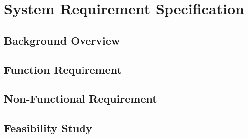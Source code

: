 \chapter{System Requirement Specification}
\section{Background Overview}
\section{Function Requirement}
\section{Non-Functional Requirement}
\section{Feasibility Study}